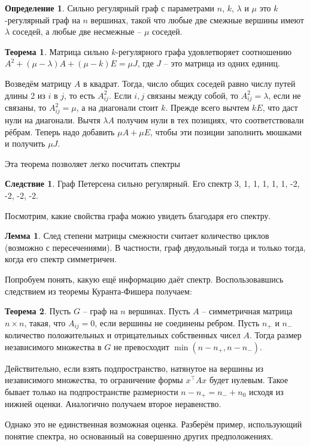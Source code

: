 \documentclass[10pt,a4paper,oneside]{book}
\theoremstyle{definition}
\newtheorem*{defn}{{\color{yellow!20!red} Определение}}
\newtheorem{thm}{{\color{red!40!black} Теорема}}
\newtheorem{lem}{Лемма}
\newtheorem{cor}{Следствие}
\def\thrm{\begin{thm}}
\def\ethrm{\end{thm}}
\def\dfn{\begin{defn}}
\def\edfn{\end{defn}}
\def\lm{\begin{lem}}
\def\elm{\end{lem}}
\def\crl{\begin{cor}}
\def\ecrl{\end{cor}}
\begin{document}
\dfn Сильно регулярный граф с параметрами $n$, $k$, $\lambda$ и $\mu$ это $k$-регулярный граф на $n$ вершинах, такой что любые две смежные вершины имеют $\lambda$ соседей, а любые две несмежные -- $\mu$ соседей.
\edfn

\thrm Матрица сильно $k$-регулярного графа удовлетворяет соотношению $A^2+(\mu-\lambda)A + (\mu-k)E=\mu J$, где $J$ -- это матрица из одних единиц.
\ethrm
\proof Возведём матрицу $A$ в квадрат. Тогда, число общих соседей равно числу путей длины 2 из $i$ в $j$, то есть $A^2_{ij}$. Если $i,j$ связаны между собой, то $A^2_{ij}=\lambda$, если не связаны, то $A^2_{ij}=\mu$, а на диагонали стоит $k$. Прежде всего вычтем $kE$, что даст нули на диагонали. Вычтя $\lambda A$ получим нули в тех позициях, что соответствовали рёбрам. Теперь надо добавить $\mu A+ \mu E$, чтобы эти позиции заполнить мюшками и получить $\mu J$. 
\endproof

Эта теорема позволяет легко посчитать спектры 
\crl
 Граф Петерсена сильно регулярный. Его спектр 3, 1, 1, 1, 1, 1, -2, -2, -2, -2.
\ecrl



Посмотрим, какие свойства графа можно увидеть благодаря его спектру.

\lm  След степени матрицы смежности считает количество циклов (возможно с пересечениями). В частности, граф двудольный тогда и только тогда, когда его спектр симметричен. 
\elm



Попробуем понять, какую ещё информацию даёт спектр. Воспользовавшись следствием из теоремы Куранта-Фишера получаем:

\thrm Пусть $G$ -- граф на $n$ вершинах. Пусть $A$ -- симметричная матрица $n\times n$, такая, что $A_{ij}= 0$, если вершины не соединены ребром. Пусть $n_{+}$ и $n_{-}$ количество положительных и отрицательных собственных чисел $A$. Тогда размер независимого множества в $G$ не превосходит $\min(n-n_{+},n-n_{-})$.
\ethrm
\proof Действительно, если взять подпространство, натянутое на вершины из независимого множества, то ограничение формы $x^{\top}Ax$ будет нулевым. Такое бывает только на подпространстве размерности $n-n_{+}=n_{-}+n_0$ исходя из нижней оценки. Аналогично получаем второе неравенство.
\endproof

Однако это не единственная возможная оценка. Разберём пример, использующий понятие спектра, но основанный на совершенно других предположениях.
\end{document}

